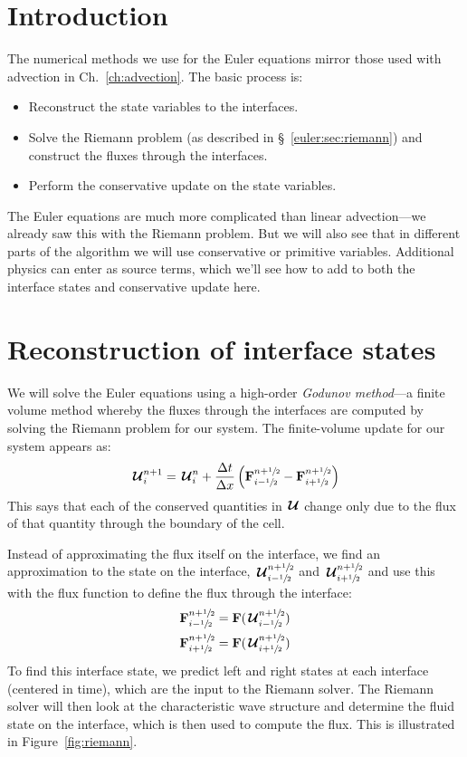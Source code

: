 \label{ch:compressible}

\section{Introduction}

\label{sec:eulermeth:intro}

The numerical methods we use for the Euler equations mirror those used
with advection in Ch.~\ref{ch:advection}.  The basic process is:
\begin{itemize}
\item Reconstruct the state variables to the interfaces.
\item Solve the Riemann problem (as described in
  \S~\ref{euler:sec:riemann}) and construct the fluxes through
  the interfaces.
\item Perform the conservative update on the state variables.
\end{itemize}
The Euler equations are much more complicated than linear
advection---we already saw this with the Riemann problem.  But we will
also see that in different parts of the algorithm we will use
conservative or primitive variables.  Additional physics can enter as
source terms, which we'll see how to add to both the interface states
and conservative update here.

\section{Reconstruction of interface states}

\label{sec:onedrecon}

We will solve the Euler equations using a high-order {\em Godunov
  method}---a finite volume method whereby the fluxes through the
interfaces are computed by solving the Riemann problem for our system.
The finite-volume update for our system appears as:
\begin{equation}
{\,\boldsymbol{\mathcal{U}}}^{n+1}_i = {\,\boldsymbol{\mathcal{U}}}^n_i + \frac{\Delta t}{\Delta x} \left ( {\bf F}_{i-{\sfrac{1}{2}}}^{n+{\sfrac{1}{2}}} - {\bf F}_{i+{\sfrac{1}{2}}}^{n+{\sfrac{1}{2}}} \right )
\end{equation}
This says that each of the conserved quantities in ${\,\boldsymbol{\mathcal{U}}}$ change only due
to the flux of that quantity through the boundary of the cell.

Instead of approximating the flux itself on the interface, we find an
approximation to the state on the interface, ${\,\boldsymbol{\mathcal{U}}}_{i-{\sfrac{1}{2}}}^{n+{\sfrac{1}{2}}}$ and
${\,\boldsymbol{\mathcal{U}}}_{i+{\sfrac{1}{2}}}^{n+{\sfrac{1}{2}}}$ and use this with the flux function to define the
flux through the interface:
\begin{align}
{\bf F}_{i-{\sfrac{1}{2}}}^{n+{\sfrac{1}{2}}} &= {\bf F}({\,\boldsymbol{\mathcal{U}}}_{i-{\sfrac{1}{2}}}^{n+{\sfrac{1}{2}}}) \\
{\bf F}_{i+{\sfrac{1}{2}}}^{n+{\sfrac{1}{2}}} &= {\bf F}({\,\boldsymbol{\mathcal{U}}}_{i+{\sfrac{1}{2}}}^{n+{\sfrac{1}{2}}})
\end{align}
To find this interface state, we predict left and right states at each
interface (centered in time), which are the input to the Riemann
solver.  The Riemann solver will then look at the characteristic wave
structure and determine the fluid state on the interface, which is
then used to compute the flux.  This is illustrated in
Figure~\ref{fig:riemann}.

